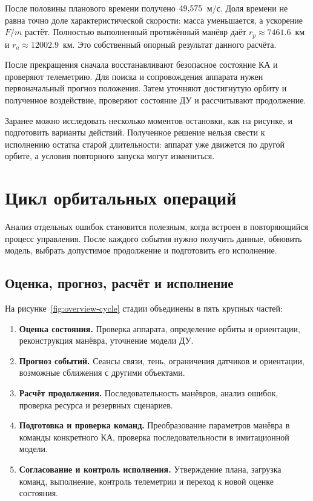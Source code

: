\documentclass[a4paper,11pt]{article}
\numberwithin{equation}{section}
\begin{document}
После половины планового времени получено
$49{,}575$~м/с.
Доля времени не равна точно доле характеристической скорости:
масса уменьшается, а ускорение $F/m$ растёт.
Полностью выполненный протяжённый манёвр даёт
$r_p\approx7461.6$~км и $r_a\approx12002.9$~км.
Это собственный опорный результат данного расчёта.

После прекращения сначала восстанавливают безопасное состояние
КА и проверяют телеметрию. Для поиска и сопровождения аппарата
нужен первоначальный прогноз положения.
Затем уточняют достигнутую орбиту и полученное воздействие,
проверяют состояние ДУ и рассчитывают продолжение.

Заранее можно исследовать несколько моментов остановки,
как на рисунке, и подготовить варианты действий.
Полученное решение нельзя свести к исполнению остатка
старой длительности: аппарат уже движется по другой орбите,
а условия повторного запуска могут измениться.
\FloatBarrier

\section{Цикл орбитальных операций}
\label{sec:cycle}

Анализ отдельных ошибок становится полезным, когда встроен
в повторяющийся процесс управления. После каждого события
нужно получить данные, обновить модель, выбрать допустимое
продолжение и подготовить его исполнение.

\subsection{Оценка, прогноз, расчёт и исполнение}

На рисунке~\ref{fig:overview-cycle} стадии объединены
в пять крупных частей:
\begin{enumerate}
\item \textbf{Оценка состояния.}
Проверка аппарата, определение орбиты и ориентации,
реконструкция манёвра, уточнение модели ДУ.
\item \textbf{Прогноз событий.}
Сеансы связи, тень, ограничения датчиков и ориентации,
возможные сближения с другими объектами.
\item \textbf{Расчёт продолжения.}
Последовательность манёвров, анализ ошибок, проверка
ресурса и резервных сценариев.
\item \textbf{Подготовка и проверка команд.}
Преобразование параметров манёвра в команды конкретного КА,
проверка последовательности в имитационной модели.
\item \textbf{Согласование и контроль исполнения.}
Утверждение плана, загрузка команд, выполнение,
контроль телеметрии и переход к новой оценке состояния.
\end{enumerate}
\end{document}
